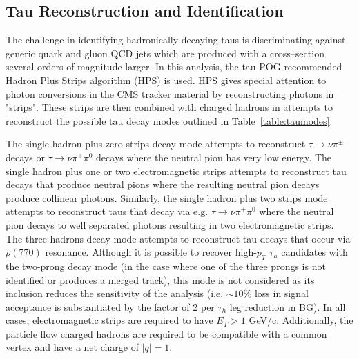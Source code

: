 \subsection{Tau Reconstruction and Identification}
The challenge in identifying hadronically decaying taus is discriminating against generic quark and gluon QCD jets 
which are produced with a cross--section several orders of magnitude larger. In this analysis, the tau POG 
recommended Hadron Plus Strips algorithm (HPS) is used. HPS gives special attention to photon conversions in 
the CMS tracker material by reconstructing photons in "strips". These strips are then combined with charged hadrons 
in attempts to reconstruct the possible tau decay modes outlined in Table~\ref{table:taumodes}.

\begin{table}[ht]
  \caption{Reconstructed Tau Decay Modes}
  \label{table:taumodes} %
\end{table}

The single hadron plus zero strips decay mode attempts to reconstruct $\tau \to \nu\pi^{\pm}$ decays or $\tau \to 
\nu\pi^{\pm}\pi^{0}$ decays where the neutral pion has very low energy. The single hadron plus one or two 
electromagnetic strips attempts to reconstruct tau decays that produce neutral pions where the resulting neutral pion 
decays produce collinear photons. Similarly, the single hadron plus two strips mode attempts to reconstruct taus that 
decay via e.g. $\tau \to \nu\pi^{\pm}\pi^{0}$ where the neutral pion decays to well separated photons resulting in two 
electromagnetic strips. The three hadrons decay mode attempts to reconstruct tau decays that occur via 
$\rho(770)$ resonance. Although it is possible to recover high-$p_{T}$ $\tau_{h}$ candidates with the two-prong decay mode (in the case where one of the
three prongs is not identified or produces a merged track), this mode is not considered as its inclusion reduces the sensitivity of the analysis (i.e. 
$\sim 10$\% loss in signal acceptance is substantiated by the factor of 2 per $\tau_{h}$ leg reduction in BG). 
In all cases, electromagnetic strips are 
required to have $E_{T} > 1$ GeV/c. Additionally,
the particle flow charged hadrons are required to be compatible with a common 
vertex and have a net charge of $|q|=1$.

